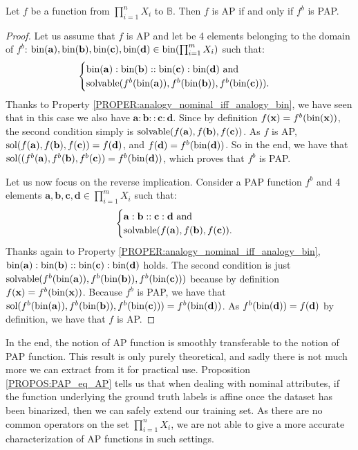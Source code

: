 \begin{proposition}
  \label{PROPOS:PAP_eq_AP}
Let $f$ be a function from $\prod_{i=1}^n X_i$ to $\mathbb{B}$. Then $f$ is AP
if and only if $f^b$ is PAP.
\end{proposition}
\begin{proof}
  Let us assume that $f$ is AP and let be 4 elements belonging to the domain of
  $f^b$: $\text{bin}(\mathbf{a}),\text{bin}(\mathbf{b}), \text{bin}(\mathbf{c}), \text{bin}(\mathbf{d})
  \in \text{bin}(\prod_{i=1}^m X_i)$ such that:
  $$\begin{cases}
    \text{bin}(\mathbf{a}):\text{bin}(\mathbf{b})::\text{bin}(\mathbf{c}):\text{bin}(\mathbf{d}) \mbox{
      and}\\
    \text{solvable}(f^b(\text{bin}(\mathbf{a})),f^b(\text{bin}(\mathbf{b})),f^b(\text{bin}(\mathbf{c}))).
  \end{cases}
  $$
Thanks to Property \ref{PROPER:analogy_nominal_iff_analogy_bin}, we have seen
  that in this case we also have
  $\mathbf{a}:\mathbf{b}::\mathbf{c}:\mathbf{d}$.  Since by definition
  $f(\mathbf{x}) = f^b(\text{bin}(\mathbf{x}))$,  the second condition simply is
  $\text{solvable}(f(\mathbf{a}),f(\mathbf{b}),f(\mathbf{c}))$. As $f$ is AP,
  $\text{sol}(f(\mathbf{a}),f(\mathbf{b}),f(\mathbf{c}))= f(\mathbf{d})$, and
  $f(\mathbf{d}) = f^b(\text{bin}(\mathbf{d}))$. So in the end, we have that
  $\text{sol}((f^b(\mathbf{a}),f^b(\mathbf{b}),f^b(\mathbf{c})) =
  f^b(\text{bin}(\mathbf{d}))$, which proves that $f^b$ is PAP.

  Let us now focus on the reverse implication. Consider a PAP function
  $f^b$ and 4 elements $\mathbf{a}, \mathbf{b}, \mathbf{c}, \mathbf{d} \in
  \prod_{i=1}^m X_i$ such that:
  $$
  \begin{cases}
  \mathbf{a}:\mathbf{b}::\mathbf{c}:\mathbf{d} \mbox{ and}\\
  \text{solvable}(f(\mathbf{a}),f(\mathbf{b}),f(\mathbf{c})).
  \end{cases}
  $$
  Thanks again to Property \ref{PROPER:analogy_nominal_iff_analogy_bin},
  $\text{bin}(\mathbf{a}):\text{bin}(\mathbf{b})::\text{bin}(\mathbf{c}):\text{bin}(\mathbf{d})$ holds. 
  The second condition is just
  $\text{solvable}(f^b(\text{bin}(\mathbf{a})),f^b(\text{bin}(\mathbf{b})),f^b(\text{bin}(\mathbf{c})))$
  because by definition $f(\mathbf{x}) = f^b(\text{bin}(\mathbf{x}))$. Because
  $f^b$ is PAP, we have that
  $\text{sol}(f^b(\text{bin}(\mathbf{a})),f^b(\text{bin}(\mathbf{b})),f^b(\text{bin}(\mathbf{c}))) =
  f^b(\text{bin}(\mathbf{d}))$. As $f^b(\text{bin}(\mathbf{d}))=f(\mathbf{d})$ by
  definition, we have that $f$ is AP.
\end{proof}

In the end, the notion of AP function is smoothly transferable to the notion
of PAP function. This result is only purely theoretical, and sadly there is  
not much more we can extract from it for practical use. Proposition
\ref{PROPOS:PAP_eq_AP} tells us that when dealing with nominal attributes, if
the function underlying the ground truth labels is affine once the dataset has
been binarized, then we can safely extend our training set. As
there are no common operators on the set  $\prod_{i=1}^n X_i$, we are not able
to give a more accurate characterization of AP functions in such settings.

